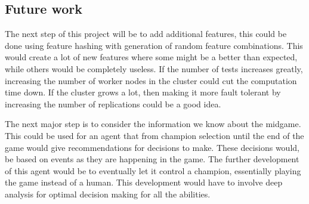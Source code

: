 \subsection{Future work}\label{sec:futurework}
The next step of this project will be to add additional features, this could be done using feature hashing with generation of random feature combinations. This would create a lot of new features where some might be a better than expected, while others would be completely useless.
If the number of tests increases greatly, increasing the number of worker nodes in the cluster could cut the computation time down. If the cluster grows a lot, then making it more fault tolerant by increasing the number of replications could be a good idea.

The next major step is to consider the information we know about the midgame. This could be used for an agent that from champion selection until the end of the game would give recommendations for decisions to make. These decisions would, be based on events as they are happening in the game. The further development of this agent would be to eventually let it control a champion, essentially playing the game instead of a human. This development would have to involve deep analysis for optimal decision making for all the abilities.

